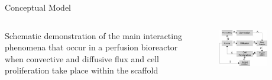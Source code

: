 \documentclass[11pt,t]{beamer}
\begin{document}
\begin{frame}[fragile]{Conceptual Model}  

	\begin{columns}[t]
		\begin{column}{.40\textwidth}
Schematic demonstration of the main interacting phenomena that occur in a perfusion bioreactor when convective and diffusive flux and cell proliferation take place within the scaffold
	
 
		\end{column}
		\begin{column}{.60\textwidth}
			\vspace{-20pt}
			\begin{figure}
			\centering
			\includegraphics[width=0.8\textwidth]{math_scheme}
			
			\end{figure}
		\end{column}
	\end{columns}	
		
\end{frame}
\end{document}
